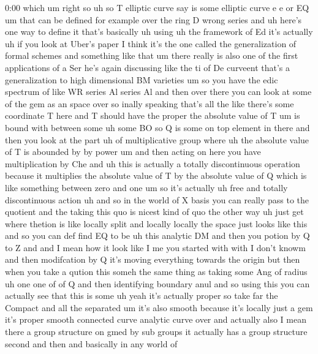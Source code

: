 \begin{unfinished}{0:00}
which
um  right  so
uh  so  T  elliptic  curve  say  is  some
elliptic  curve
e  e  or  EQ  um  that  can  be  defined  for
example  over  the  ring  D  wrong
series  and  uh  here's  one  way  to  define
it
that's  basically  uh  using  uh  the
framework  of
Ed  it's  actually  uh  if  you  look  at
Uber's  paper  I  think  it's  the  one  called
the  generalization  of  formal  schemes  and
something  like  that  um  there  really  is
also  one  of  the  first  applications  of  a
Ser  he's  again  discussing  like  the  ti  of
De  curveent  that's  a  generalization  to
high  dimensional  BM
varieties  um
so  you  have  the  edic  spectrum  of  like  WR
series
Al  series
Al  and
then  over  there  you  can  look  at  some  of
the  gem  as  an  space
over  so  inally  speaking  that's  all
the  like  there's  some  coordinate  T  here
and  T  should  have  the  proper  the
absolute  value  of  T
um  is  bound  with  between
some  uh  some
BO  so  Q  is  some  on  top  element  in  there
and  then  you  look  at  the  part  uh  of
multiplicative  group  where  uh  the
absolute  value  of  T  is  abounded
by  by  power  um  and  then  acting  on  here
you  have  multiplication  by
Che
and  uh  this  is  actually  a  totally
discontinuous  operation  because  it
multiplies  the  absolute  value  of  T  by
the  absolute  value  of  Q  which  is  like
something  between  zero  and  one  um  so
it's  actually  uh  free  and  totally
discontinuous  action  uh  and  so  in  the
world  of  X  basis  you  can  really  pass  to
the  quotient  and  the  taking  this  quo  is
nicest  kind  of  quo  the  other  way  uh  just
get  where  thetion  is  like  locally  split
and  locally  locally  the  space  just  looks
like
this  and  so  you  can  def  find  EQ  to
be  uh  this  analytic  DM  and  then  you
potion
by  Q  to
Z  and
and  I  mean  how  it  look  like  I  me  you
started  with  with  I  don't
knowm  and  then  modifcation  by  Q  it's
moving  everything  towards  the  origin  but
then  when  you  take  a  qution  this  someh
the  same  thing  as  taking  some  Ang  of
radius  uh  one  one  of  of  Q  and  then
identifying  boundary
anul  and  so  using  this  you  can  actually
see  that  this  is
some  uh  yeah  it's  actually  proper  so
take  far  the  Compact  and  all  the
separated  um  it's  also  smooth  because
it's  locally  just  a
gem  it's  proper  smooth  connected  curve
analytic  curve
over  and  actually  also  I  mean  there  a
group  structure  on
gmed  by  sub  groups  it  actually  has  a
group  structure
second
and  then  and  basically  in  any  world  of

\end{unfinished}
